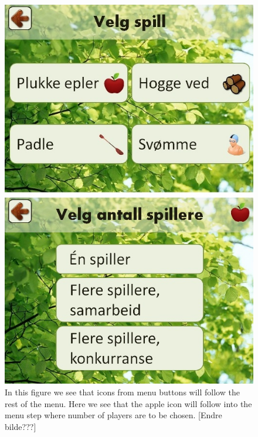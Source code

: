 \begin{figure} [H]
\centering
\includegraphics[scale=0.5]{IconEple.jpg}
\caption[Menu - use of icons]{In this figure we see that icons from menu buttons will follow the rest of the menu. Here we see that the apple icon will follow into the menu step where number of players are to be chosen. [Endre bilde???]}
\label{fig:iconEple}
\end{figure} 
     

